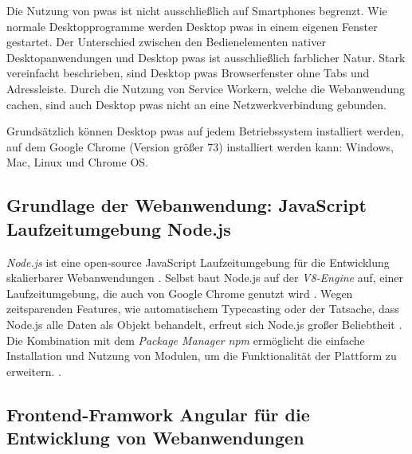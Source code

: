 



Die Nutzung von \ac{pwa}s ist nicht ausschließlich auf Smartphones begrenzt. Wie normale Desktopprogramme werden Desktop \ac{pwa}s in einem eigenen Fenster gestartet. 
Der Unterschied zwischen den Bedienelementen nativer Desktopanwendungen und Desktop \ac{pwa}s ist ausschließlich farblicher Natur. Stark vereinfacht beschrieben, sind Desktop \ac{pwa}s Browserfenster ohne Tabs und Adressleiste. Durch die Nutzung von Service Workern, welche die Webanwendung cachen, sind auch Desktop \ac{pwa}s nicht an eine Netzwerkverbindung gebunden.

Grundsätzlich können Desktop \ac{pwa}s auf jedem Betriebssystem installiert werden, auf dem Google Chrome (Version größer 73) installiert werden kann: Windows, Mac, Linux und Chrome OS.
\cite{GooglePWADesktop}



\subsection{Grundlage der Webanwendung: JavaScript Laufzeitumgebung Node.js}

\textit{Node.js} ist eine open-source JavaScript Laufzeitumgebung für die Entwicklung skalierbarer Webanwendungen 
\cite{NodeJSWebsiteAbout}.
Selbst baut Node.js auf der \textit{V8-Engine} auf, einer Laufzeitumgebung, die auch von Google Chrome genutzt wird 
\cite[S. 1]{NodeJSRecepies}.
Wegen zeitsparenden Features, wie automatischem Typecasting oder der Tatsache, dass Node.js alle Daten als Objekt behandelt, erfreut sich Node.js großer Beliebtheit 
\cite[S. 12]{PracitalNodeJS}.
Die Kombination mit dem \textit{Package Manager npm} ermöglicht die einfache Installation und Nutzung von Modulen, um die Funktionalität der Plattform zu erweitern. 
\cite[S. 9]{NodeJSRecepies}.


\subsection{Frontend-Framwork Angular für die Entwicklung von Webanwendungen}

